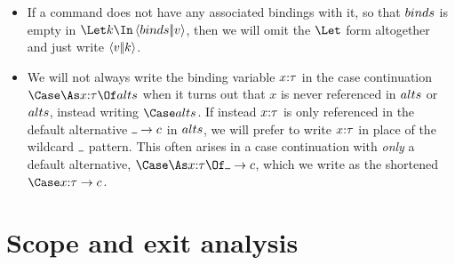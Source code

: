 \documentclass{article}
\begin{document}
\begin{itemize}
\item If a command does not have any associated bindings with it, so that
  $binds$ is empty in $\mcut{\binds}{\tm}{\ko}$, then we will omit the $\Let$
  form altogether and just write $\left\langle{v}\middle|\!\middle|{k}\right\rangle$.

\item We will not always write the binding variable $x{:}{\tau}$ in the case
  continuation $\caseas{\ann x \ty}{\alts}$ when it turns out that $x$ is never
  referenced in $alts$ or $alts$, instead writing $\Case\alts$.  If instead
  $x{:}{\tau}$ is only referenced in the default alternative
  $\alt{\blank}{\com}$ in $alts$, we will prefer to write $x{:}{\tau}$ in place
  of the wildcard $\blank$ pattern.  This often arises in a case continuation
  with \emph{only} a default alternative,
  $\caseas{\ann x \ty}{\alt{\blank}{\com}}$, which we write as the shortened
  $\Case\alt{\ann x \ty}{\com}$.
\end{itemize}

\section{Scope and exit analysis}
\label{sec:scope-analysis}
\end{document}
